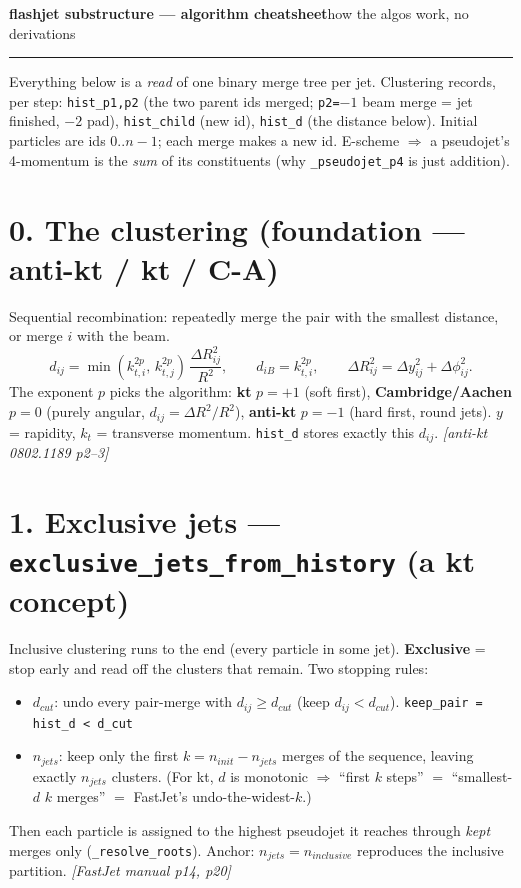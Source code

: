 \documentclass[10pt]{article}
\newcommand{\code}[1]{\texttt{\small #1}}
\newcommand{\dR}{\Delta R}
\begin{document}
{\Large\bfseries flashjet substructure --- algorithm cheatsheet}\hfill{\small how the algos work, no derivations}

\vspace{2pt}\hrule\vspace{4pt}

Everything below is a \emph{read} of one binary merge tree per jet. Clustering records, per step:
\code{hist\_p1,p2} (the two parent ids merged; \code{p2=$-1$} beam merge = jet finished, \code{$-2$} pad),
\code{hist\_child} (new id), \code{hist\_d} (the distance below). Initial particles are ids $0..n{-}1$;
each merge makes a new id. E-scheme $\Rightarrow$ a pseudojet's 4-momentum is the \emph{sum} of its
constituents (why \code{\_pseudojet\_p4} is just addition).

\section*{0. The clustering (foundation --- anti-kt / kt / C-A)}
Sequential recombination: repeatedly merge the pair with the smallest distance, or merge $i$ with the beam.
\[
d_{ij}=\min(k_{t,i}^{2p},\,k_{t,j}^{2p})\,\frac{\dR_{ij}^2}{R^2},\qquad
d_{iB}=k_{t,i}^{2p},\qquad \dR_{ij}^2=\Delta y_{ij}^2+\Delta\phi_{ij}^2 .
\]
The exponent $p$ picks the algorithm: \textbf{kt} $p{=}{+}1$ (soft first), \textbf{Cambridge/Aachen} $p{=}0$
(purely angular, $d_{ij}=\dR^2/R^2$), \textbf{anti-kt} $p{=}{-}1$ (hard first, round jets).
$y$ = rapidity, $k_t$ = transverse momentum. \code{hist\_d} stores exactly this $d_{ij}$.
\hfill\emph{[anti-kt 0802.1189 p2--3]}

\section*{1. Exclusive jets --- \code{exclusive\_jets\_from\_history} (a kt concept)}
Inclusive clustering runs to the end (every particle in some jet). \textbf{Exclusive} = stop early and
read off the clusters that remain. Two stopping rules:
\begin{itemize}[nosep,leftmargin=1.4em]
  \item \textbf{$d_{cut}$}: undo every pair-merge with $d_{ij}\ge d_{cut}$ (keep $d_{ij}<d_{cut}$).
        \hfill\code{keep\_pair = hist\_d < d\_cut}
  \item \textbf{$n_{jets}$}: keep only the first $k=n_{init}-n_{jets}$ merges of the sequence,
        leaving exactly $n_{jets}$ clusters. (For kt, $d$ is monotonic $\Rightarrow$ ``first $k$
        steps'' $=$ ``smallest-$d$ $k$ merges'' $=$ FastJet's undo-the-widest-$k$.)
\end{itemize}
Then each particle is assigned to the highest pseudojet it reaches through \emph{kept} merges only
(\code{\_resolve\_roots}). Anchor: $n_{jets}=n_{inclusive}$ reproduces the inclusive partition.
\hfill\emph{[FastJet manual p14, p20]}
\end{document}
